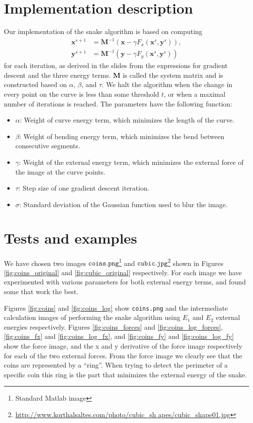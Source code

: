 \documentclass[11pt,a4paper]{article}
\begin{document}
\section{Implementation description}
%
Our implementation of the snake algorithm is based on computing
%
\begin{align}
\mathbf{x}^{s+1} &= \mathbf{M}^{-1} (\mathbf{x} - \gamma F_x(\mathbf{x}^s, \mathbf{y}^s)), \\
\mathbf{y}^{s+1} &= \mathbf{M}^{-1} (\mathbf{y} - \gamma F_y(\mathbf{x}^s, \mathbf{y}^s))
\end{align}
%
for each iteration, as derived in the slides from the expressions for gradient descent and the three energy terms. $\mathbf{M}$ is called the system matrix and is constructed based on $\alpha$, $\beta$, and $\tau$. We halt the algorithm when the change in every point on the curve is less than some threshold $t$, or when a maximal number of iterations is reached. The parameters have the following function:
%
\begin{itemize}
\item $\alpha$: Weight of curve energy term, which minimizes the length of the curve.
\item $\beta$: Weight of bending energy term, which minimizes the bend between consecutive segments.
\item $\gamma$: Weight of the external energy term, which minimizes the external force of the image at the curve points.
\item $\tau$: Step size of one gradient descent iteration.
\item $\sigma$: Standard deviation of the Gaussian function used to blur the image.
\end{itemize}
%
\section{Tests and examples}
%
We have chosen two images
$\texttt{coins.png}$\footnote{Standard Matlab image} and
$\texttt{cubic.jpg}$\footnote{\url{http://www.korthalsaltes.com/photo/cubic_sh
apes/cubic_shape01.jpg}} shown in Figures \ref{fig:coins_original} and
\ref{fig:cubic_original} respectively. For each image we have experimented
with various parameters for both external energy terms, and found some that
work the best.

Figures \ref{fig:coins} and \ref{fig:coins_log} show \texttt{coins.png} and the
intermediate calculation images of performing the snake algorithm using $E_1$ and $E_2$ external energies respectively.
Figures \ref{fig:coins_forces} and \ref{fig:coins_log_forces},
\ref{fig:coins_fx} and \ref{fig:coins_log_fx}, and \ref{fig:coins_fy} and
\ref{fig:coins_log_fy} show
the force image, and the x and y derivative of the force image respectively for
each of the two external forces.
From the force image we clearly see that the coins are represented by a
``ring''. When trying to detect the perimeter of a specific coin this ring is
the part that minimizes the external energy of the snake.
\end{document}
